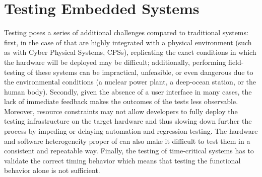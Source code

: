 \section{Testing Embedded Systems}
Testing \ess poses a series of additional challenges compared to traditional systems: first, in the case of \ess that are highly integrated with a physical environment (such as with Cyber Physical Systems, CPSs), replicating the exact conditions in which the hardware will be deployed may be difficult; additionally, performing field-testing of these systems can be impractical, unfeasible, or even dangerous due to the environmental conditions (\eg a nuclear power plant, a deep-ocean station, or the human body). Secondly, given the absence of a user interface in many cases, the lack of immediate feedback makes the outcomes of the tests less observable. Moreover, resource constraints may not allow developers to fully deploy the testing infrastructure on the target hardware and thus slowing down further the process by impeding or delaying automation and regression testing. The hardware and software heterogeneity proper of \ess can also make it difficult to test them in a consistent and repeatable way. Finally, the testing of time-critical systems has to validate the correct timing behavior which means that testing the functional behavior alone is not sufficient.


